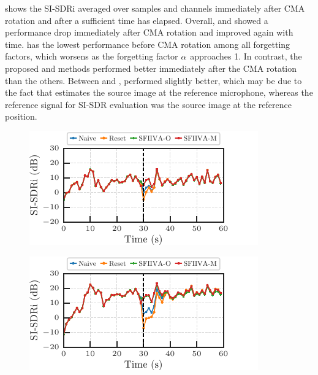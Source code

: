 \documentclass[sip,biber]{now-journal}
\begin{document}
 shows the SI-SDRi averaged over samples and channels immediately after CMA rotation and after a sufficient time has elapsed.
Overall, \NaiveIVA{} and \ResetIVA{} showed a performance drop immediately after CMA rotation and improved again with time.
\ResetIVA{} has the lowest performance before CMA rotation among all forgetting factors, which worsens as the forgetting factor $\alpha$ approaches 1.
In contrast, the proposed \SFIIVAm{} and \SFIIVAo{} methods performed better immediately after the CMA rotation than the others.
Between \SFIIVAm{} and \SFIIVAo{}, \SFIIVAm{} performed slightly better,
which may be due to the fact that \SFIIVAo{} estimates the source image at the reference microphone,
whereas the reference signal for SI-SDR evaluation was the source image at the reference position.
\begin{figure}[t]
  \centering
  \begin{minipage}[t]{.45\textwidth}
    \centering\includegraphics{figures/plots/clean/line_900.pdf}\label{fig:plot:line:900}
  \end{minipage}
  \hspace{.05\textwidth}
  \begin{minipage}[t]{.45\textwidth}
    \centering\includegraphics{figures/plots/clean/line_950.pdf}\label{fig:plot:line:950}
  \end{minipage}


\end{figure}
\end{document}

